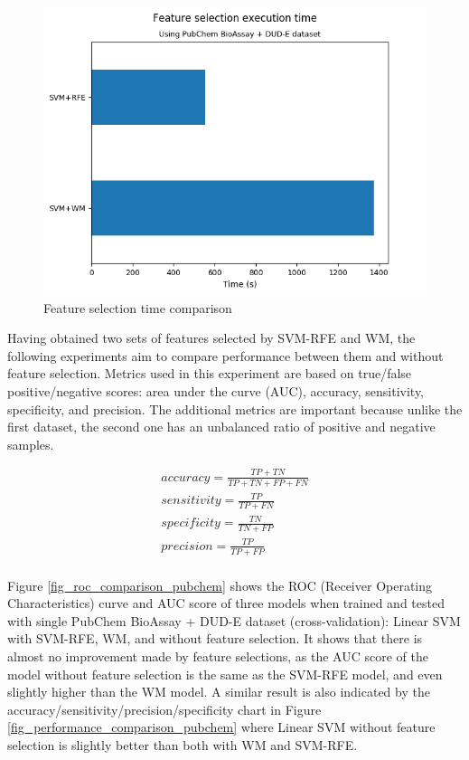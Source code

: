 \documentclass[conference]{IEEEtran}
\begin{document}
\begin{figure}
	\centering	
	\includegraphics[scale=0.4]{../images/feature_selection_time_comparison.png}
	\caption{Feature selection time comparison}
	\label{fig_feature_selection_time_comparison}
\end{figure}

Having obtained two sets of features selected by SVM-RFE and WM, the following experiments aim to compare performance between them and without feature selection. Metrics used in this experiment are based on true/false positive/negative scores: area under the curve (AUC), accuracy, sensitivity, specificity, and precision. The additional metrics are important because unlike the first dataset, the second one has an unbalanced ratio of positive and negative samples.

\begin{align}
	accuracy = \frac{TP + TN}{TP + TN + FP + FN} \\
	sensitivity = \frac{TP}{TP + FN} \\	
	specificity = \frac{TN}{TN + FP} \\		
	precision = \frac{TP}{TP + FP} \\			
	\label{eq_performance_metrics}
\end{align}

Figure \ref{fig_roc_comparison_pubchem} shows the ROC (Receiver Operating Characteristics) curve and AUC score of three models when trained and tested with single PubChem BioAssay + DUD-E dataset (cross-validation): Linear SVM with SVM-RFE, WM, and without feature selection. It shows that there is almost no improvement made by feature selections, as the AUC score of the model without feature selection is the same as the SVM-RFE model, and even slightly higher than the WM model. A similar result is also indicated by the accuracy/sensitivity/precision/specificity chart in Figure \ref{fig_performance_comparison_pubchem} where Linear SVM without feature selection is slightly better than both with WM and SVM-RFE.
\end{document}
